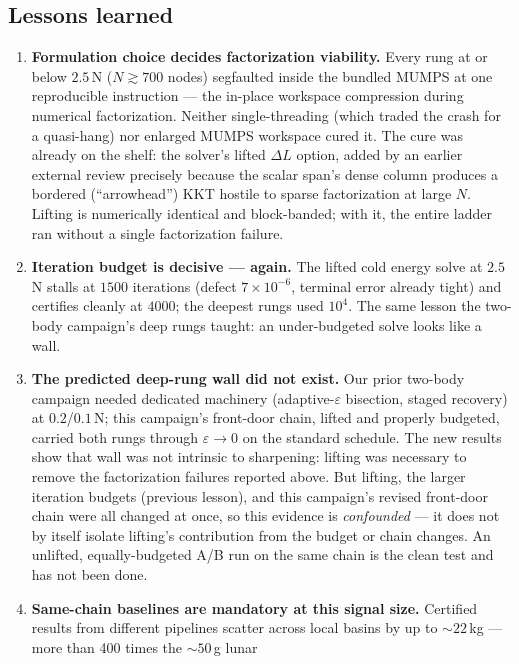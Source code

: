 \documentclass[11pt]{article}
\begin{document}
\subsection{Lessons learned}

\begin{enumerate}
\item \textbf{Formulation choice decides factorization viability.} Every
  rung at or below $2.5$\,N ($N \gtrsim 700$ nodes) segfaulted inside the
  bundled MUMPS at one reproducible instruction --- the in-place workspace
  compression during numerical factorization. Neither single-threading
  (which traded the crash for a quasi-hang) nor enlarged MUMPS workspace
  cured it. The cure was already on the shelf: the solver's lifted
  $\Delta L$ option, added by an earlier external review precisely because
  the scalar span's dense column produces a bordered (``arrowhead'') KKT
  hostile to sparse factorization at large $N$. Lifting is numerically
  identical and block-banded; with it, the entire ladder ran without a
  single factorization failure.
\item \textbf{Iteration budget is decisive --- again.} The lifted cold
  energy solve at $2.5$\,N stalls at $1500$ iterations (defect
  $7\times10^{-6}$, terminal error already tight) and certifies cleanly at
  $4000$; the deepest rungs used $10^4$. The same lesson the two-body
  campaign's deep rungs taught: an under-budgeted solve looks like a wall.
\item \textbf{The predicted deep-rung wall did not exist.} Our prior
  two-body campaign needed dedicated machinery (adaptive-$\varepsilon$
  bisection, staged recovery) at $0.2$/$0.1$\,N; this campaign's front-door
  chain, lifted and properly budgeted, carried both rungs through
  $\varepsilon \to 0$ on the standard schedule. The new results show that
  wall was not intrinsic to sharpening: lifting was necessary to remove the
  factorization failures reported above. But lifting, the larger iteration
  budgets (previous lesson), and this campaign's revised front-door chain
  were all changed at once, so this evidence is \emph{confounded} --- it
  does not by itself isolate lifting's contribution from the budget or
  chain changes. An unlifted, equally-budgeted A/B run on the same chain is
  the clean test and has not been done.
\item \textbf{Same-chain baselines are mandatory at this signal size.}
  Certified results from different pipelines scatter across local basins
  by up to $\sim 22$\,kg --- more than 400 times the $\sim 50$\,g lunar

\end{enumerate}
\end{document}
